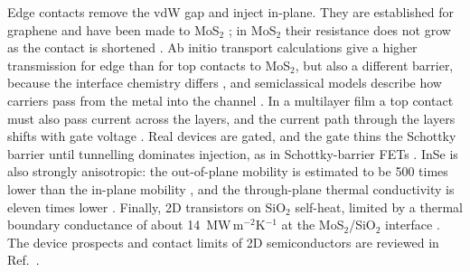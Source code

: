 \documentclass[11pt]{article}
\begin{document}
Edge contacts remove the vdW gap and inject in-plane. They are established for graphene \cite{refwang} and have been made to MoS$_2$ \cite{refguim,refcheng,refjain}; in MoS$_2$ their resistance does not grow as the contact is shortened \cite{refcheng}. Ab initio transport calculations give a higher transmission for edge than for top contacts to MoS$_2$, but also a different barrier, because the interface chemistry differs \cite{refszabo,refparto}, and semiclassical models describe how carriers pass from the metal into the channel \cite{refarutchelvan}. In a multilayer film a top contact must also pass current across the layers, and the current path through the layers shifts with gate voltage \cite{refdasapp}. Real devices are gated, and the gate thins the Schottky barrier until tunnelling dominates injection, as in Schottky-barrier FETs \cite{refdas13,refpenu}. InSe is also strongly anisotropic: the out-of-plane mobility is estimated to be 500 times lower than the in-plane mobility \cite{refsangwan}, and the through-plane thermal conductivity is eleven times lower \cite{refrai}. Finally, 2D transistors on SiO$_2$ self-heat, limited by a thermal boundary conductance of about 14~MW\,m$^{-2}$K$^{-1}$ at the MoS$_2$/SiO$_2$ interface \cite{refyalon}. The device prospects and contact limits of 2D semiconductors are reviewed in Ref.~\cite{reffiori}.
\end{document}
